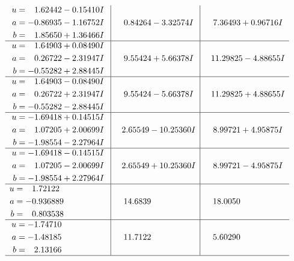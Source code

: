 \documentclass[1p]{elsarticle_modified}
\theoremstyle{definition}
\begin{document}
$$\begin{array}{c|c|c}
\begin{aligned}
u &= \phantom{-}1.62442 - 0.15410 I \\
a &= -0.86935 - 1.16752 I \\
b &= \phantom{-}1.85650 + 1.36466 I\end{aligned}
 & \phantom{-}0.84264 - 3.32574 I & \phantom{-}7.36493 + 0.96716 I \\ \hline\begin{aligned}
u &= \phantom{-}1.64903 + 0.08490 I \\
a &= \phantom{-}0.26722 - 2.31947 I \\
b &= -0.55282 + 2.88445 I\end{aligned}
 & \phantom{-}9.55424 + 5.66378 I & \phantom{-}11.29825 - 4.88655 I \\ \hline\begin{aligned}
u &= \phantom{-}1.64903 - 0.08490 I \\
a &= \phantom{-}0.26722 + 2.31947 I \\
b &= -0.55282 - 2.88445 I\end{aligned}
 & \phantom{-}9.55424 - 5.66378 I & \phantom{-}11.29825 + 4.88655 I \\ \hline\begin{aligned}
u &= -1.69418 + 0.14515 I \\
a &= \phantom{-}1.07205 + 2.00699 I \\
b &= -1.98554 - 2.27964 I\end{aligned}
 & \phantom{-}2.65549 - 10.25360 I & \phantom{-}8.99721 + 4.95875 I \\ \hline\begin{aligned}
u &= -1.69418 - 0.14515 I \\
a &= \phantom{-}1.07205 - 2.00699 I \\
b &= -1.98554 + 2.27964 I\end{aligned}
 & \phantom{-}2.65549 + 10.25360 I & \phantom{-}8.99721 - 4.95875 I \\ \hline\begin{aligned}
u &= \phantom{-}1.72122\phantom{ +0.000000I} \\
a &= -0.936889\phantom{ +0.000000I} \\
b &= \phantom{-}0.803538\phantom{ +0.000000I}\end{aligned}
 & \phantom{-}14.6839\phantom{ +0.000000I} & \phantom{-}18.0050\phantom{ +0.000000I} \\ \hline\begin{aligned}
u &= -1.74710\phantom{ +0.000000I} \\
a &= -1.48185\phantom{ +0.000000I} \\
b &= \phantom{-}2.13166\phantom{ +0.000000I}\end{aligned}
 & \phantom{-}11.7122\phantom{ +0.000000I} & \phantom{-}5.60290\phantom{ +0.000000I}\\
 \hline 
 \end{array}$$\newpage\newpage\renewcommand{\arraystretch}{1}
\end{document}
